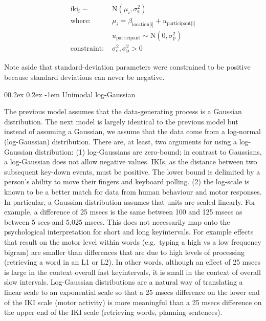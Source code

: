 \documentclass[
  english,
  man,floatsintext]{apa7}
\makeatletter
\let\oldparagraph\paragraph
\renewcommand{\paragraph}[1]{\oldparagraph{#1}\mbox{}}
\renewcommand{\paragraph}{\@startsection{paragraph}{4}{\parindent}%
  {0\baselineskip \@plus 0.2ex \@minus 0.2ex}%
  {-1em}%
  {\normalfont\normalsize\bfseries\itshape\typesectitle}}
\makeatother
\begin{document}
\begin{equation}
\begin{aligned}
\label{eq:unimodgaus}
\text{iki}_i \sim\text{ } & \text{N}(\mu_i, \sigma_\text{e}^2)\\
\text{where: } & \mu_i = \beta_\text{location[i]} + u_\text{participant[i]}\\
& u_\text{participant} \sim \text{N}(0, \sigma_\text{p}^2)\\
\text{constraint: } & \sigma_\text{e}^2, \sigma_\text{p}^2>0
\end{aligned}
\end{equation}

Note aside that standard-deviation parameters were constrained to be positive because standard deviations can never be negative.

\hypertarget{unimodal-log-gaussian}{%
\paragraph{Unimodal log-Gaussian}\label{unimodal-log-gaussian}}

The previous model assumes that the data-generating process is a Gaussian distribution. The next model is largely identical to the previous model but instead of assuming a Gaussian, we assume that the data come from a log-normal (log-Gaussian) distribution. There are, at least, two arguments for using a log-Gaussian distribution: (1) log-Gaussians are zero-bound; in contrast to Gaussians, a log-Gaussian does not allow negative values. IKIs, as the distance between two subsequent key-down events, must be positive. The lower bound is delimited by a person's ability to move their fingers and keyboard polling. (2) the log-scale is known to be a better match for data from human behaviour and motor responses. In particular, a Gaussian distribution assumes that units are scaled linearly. For example, a difference of 25 msecs is the same between 100 and 125 msecs as between 5 secs and 5,025 msecs. This does not necessarily map onto the psychological interpretation for short and long keyintervals. For example effects that result on the motor level within words (e.g.~typing a high vs a low frequency bigram) are smaller than differences that are due to high levels of processing (retrieving a word in an L1 or L2). In other words, although an effect of 25 msecs is large in the context overall fast keyintervals, it is small in the context of overall slow intervals. Log-Gaussian distributions are a natural way of translating a linear scale to an exponential scale so that a 25 msecs difference on the lower end of the IKI scale (motor activity) is more meaningful than a 25 msecs difference on the upper end of the IKI scale (retrieving words, planning sentences).
\end{document}
